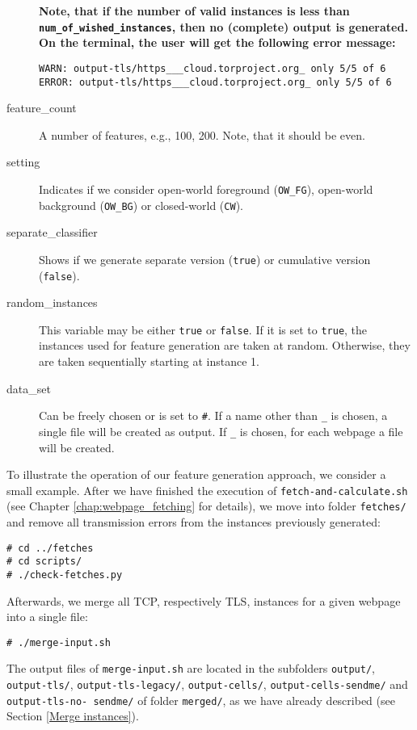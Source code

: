\begin{description}
\textbf{Note, that if the number of valid instances is less than \texttt{num\_of\_wished\_instances}, then no (complete) output is generated. On the terminal, the user will get the following error message:}
\begin{verbatim}
WARN: output-tls/https___cloud.torproject.org_ only 5/5 of 6
ERROR: output-tls/https___cloud.torproject.org_ only 5/5 of 6
\end{verbatim}
\item[feature\_count] A number of features, e.g., 100, 200. Note, that it should be even. %
\item[setting] Indicates if we consider open-world foreground (\texttt{OW\_FG}), open-world background (\texttt{OW\_BG}) or closed-world (\texttt{CW}). 
\item[separate\_classifier] Shows if we generate separate version (\texttt{true}) or cumulative version (\texttt{false}).
\item[random\_instances] This variable may be either \texttt{true} or \texttt{false}. If it is set to \texttt{true}, the instances used for feature generation are taken at random. Otherwise, they are taken sequentially starting at instance 1.
\item[data\_set] Can be freely chosen or is set to \texttt{\#}. If a name other than \texttt{\_} is chosen, a single file will be created as output. If \texttt{\_} is chosen, for each webpage a file will be created.
\end{description}

To illustrate the operation of our feature generation approach, we consider a small example. After we have finished the execution of \texttt{fetch-and-calculate.sh} (see Chapter \ref{chap:webpage_fetching} for details), we move into folder \texttt{fetches/} and remove all transmission errors from the instances previously generated:
\begin{verbatim}
# cd ../fetches
# cd scripts/
# ./check-fetches.py
\end{verbatim}

Afterwards, we merge all \ac{TCP}, respectively \ac{TLS}, instances for a given webpage into a single file:
\begin{verbatim}
# ./merge-input.sh
\end{verbatim}
The output files of \texttt{merge-input.sh} are located in the subfolders \texttt{output/}, \texttt{output-tls/}, \texttt{output-tls-legacy/}, \texttt{output-cells/}, \texttt{output-cells-sendme/} and \texttt{output-tls-no- sendme/} of folder \texttt{merged/}, as we have already described (see Section \ref{Merge instances}).

